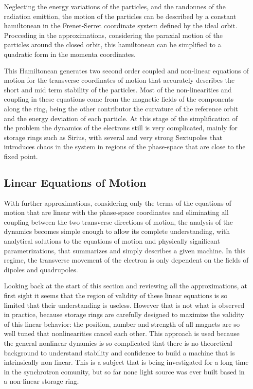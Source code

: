 \documentclass[
	12pt,				%
	openright,			%
	oneside,			%
	a4paper,		%
	chapter=TITLE,		%
	section=TITLE,		%
    brazil,				%
	english,			%
	sumario=tradicional,
	]{abntex2}
\begin{document}
    Neglecting the energy variations of the particles, and the randonnes of the radiation emittion, the motion of the particles can be described by a constant hamiltonean in the Frenet-Serret coordinate system defined by the ideal orbit. Procceding in the approximations, considering the paraxial motion of the particles around the closed orbit, this hamiltonean can be simplified to a quadratic form in the momenta coordinates.

    This Hamiltonean generates two second order coupled and non-linear equations of motion for the transverse coordinates of motion that accurately describes the short and mid term stability of the particles. Most of the non-linearities and coupling in these equations come from the magnetic fields of the components along the ring, being the other contributor the curvature of the reference orbit and the energy deviation of each particle. At this stage of the simplification of the problem the dynamics of the electrons still is very complicated, mainly for storage rings such as Sirius, with several and very strong Sextupoles that introduces chaos in the system in regions of the phase-space that are close to the fixed point.

    \subsection{Linear Equations of Motion}

	With further approximations, considering only the terms of the equations of motion that are linear with the phase-space coordinates and eliminating all coupling between the two transverse directions of motion, the analysis of the dynamics becomes simple enough to allow its complete understanding, with analytical solutions to the equations of motion and physically significant parametrizations, that summarizes and simply describes a given machine. In this regime, the transverse movement of the electron is only dependent on the fields of dipoles and quadrupoles.

	Looking back at the start of this section and reviewing all the approximations, at first sight it seems that the region of validity of these linear equations is so limited that their understanding is useless. However that is not what is observed in practice, because storage rings are carefully designed to maximize the validity of this linear behavior: the position, number and strength of all magnets are so well tuned that nonlinearities cancel each other. This approach is used because the general nonlinear dynamics is so complicated that there is no theoretical background to understand stability and confidence to build a machine that is intrinsically non-linear. This is a subject that is being investigated for a long time in the synchrotron comunity, but so far none light source was ever built based in a non-linear storage ring.
\end{document}
